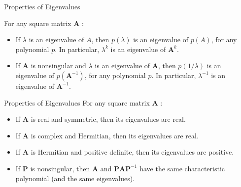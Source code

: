 \documentclass{beamer}
\begin{document}
\begin{frame}{Properties of Eigenvalues}

    For any square matrix $\mathbf{A}$ :
    \begin{itemize} 
    \item If $\lambda$ is an eigenvalue of $A$, then $p(\lambda)$ is an eigenvalue of $p(A)$, for any polynomial $p$. In particular, $\lambda^k$ is an eigenvalue of $\mathbf{A}^k$.
    \item If $\mathbf{A}$ is nonsingular and $\lambda$ is an eigenvalue of $\mathbf{A}$, then $p(1 / \lambda)$ is an eigenvalue of $p\left(\mathbf{A}^{-1}\right)$, for any polynomial $p$. In particular, $\lambda^{-1}$ is an eigenvalue of $\mathbf{A}^{-1}$.
    
\end{itemize}
\end{frame}

\begin{frame}{Properties of Eigenvalues}
    For any square matrix $\mathbf{A}$ :
\begin{itemize}
    
    \item If $\mathbf{A}$ is real and symmetric, then its eigenvalues are real.
    \item If $\mathbf{A}$ is complex and Hermitian, then its eigenvalues are real.
    \item If $\mathbf{A}$ is Hermitian and positive definite, then its eigenvalues are positive.
    \item  If $\mathbf{P}$ is nonsingular, then $\mathbf{A}$ and $\mathbf{P} \mathbf{A} \mathbf{P}^{-1}$ have the same characteristic polynomial (and the same eigenvalues).
\end{itemize}
\end{frame}
\end{document}
